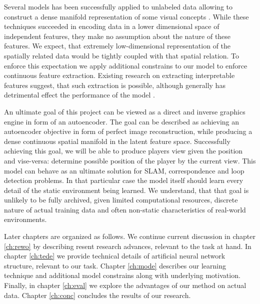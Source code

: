 Several models has been successfully applied to unlabeled data allowing to construct a dense manifold representation of some visual concepts \cite{Li2015, Kingma2013, Goodfellow2014}.
While these techniques succeeded in encoding data in a lower dimensional space of independent features, they make no assumption about the nature of these features.
We expect, that extremely low-dimensional representation of the spatially related data  would be tightly coupled with that spatial relation.
To enforce this expectation we apply additional constrains to our model to enforce continuous feature extraction.
Existing research on extracting interpretable features suggest, that such extraction is possible, although generally has detrimental effect the performance of the model \cite{Lei2016, Kulkarni2015}.

An ultimate goal of this project can be viewed as a direct and inverse graphics engine in form of an autoencoder.
The goal can be described as achieving an autoencoder objective in form of perfect image reconstruction, while producing a dense continuous spatial manifold in the latent feature space.
Successfully achieving this goal, we will be able to produce players view given the position and vise-versa: determine possible position of the player by the current view.
This model can behave as an ultimate solution for SLAM, correspondence and loop detection problems.
In that particular case the model itself should learn every detail of the static environment being learned.
We understand, that that goal is unlikely to be fully archived, given limited computational resources, discrete nature of actual training data and often non-static characteristics of real-world environments.

Later chapters are organized as follows.
We continue current discussion in chapter \ref{ch:rewo} by describing resent research advances, relevant to the task at hand.
In chapter \ref{ch:tede} we provide technical details of artificial neural network structure, relevant to our task.
Chapter \ref{ch:mode} describes our learning technique and additional model constrains along with underlying motivation.
Finally, in chapter \ref{ch:eval} we explore the advantages of our method on actual data.
Chapter \ref{ch:conc} concludes the results of our research.
